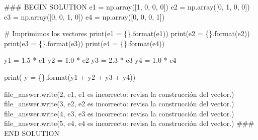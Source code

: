 \documentclass[
  letterpaper,
  DIV=11,
  numbers=noendperiod]{scrreprt}
\newenvironment{Shaded}{\begin{snugshade}}{\end{snugshade}}
\newcommand{\BuiltInTok}[1]{\textcolor[rgb]{0.00,0.23,0.31}{#1}}
\newcommand{\CommentTok}[1]{\textcolor[rgb]{0.37,0.37,0.37}{#1}}
\newcommand{\DecValTok}[1]{\textcolor[rgb]{0.68,0.00,0.00}{#1}}
\newcommand{\FloatTok}[1]{\textcolor[rgb]{0.68,0.00,0.00}{#1}}
\newcommand{\NormalTok}[1]{\textcolor[rgb]{0.00,0.23,0.31}{#1}}
\newcommand{\OperatorTok}[1]{\textcolor[rgb]{0.37,0.37,0.37}{#1}}
\newcommand{\RegionMarkerTok}[1]{\textcolor[rgb]{0.00,0.23,0.31}{#1}}
\newcommand{\SpecialCharTok}[1]{\textcolor[rgb]{0.37,0.37,0.37}{#1}}
\newcommand{\StringTok}[1]{\textcolor[rgb]{0.13,0.47,0.30}{#1}}
\begin{document}
\begin{Shaded}
\begin{Highlighting}[]
\CommentTok{\#\#\# }\RegionMarkerTok{BEGIN}\CommentTok{ SOLUTION}
\NormalTok{e1 }\OperatorTok{=}\NormalTok{ np.array([}\DecValTok{1}\NormalTok{, }\DecValTok{0}\NormalTok{, }\DecValTok{0}\NormalTok{, }\DecValTok{0}\NormalTok{])}
\NormalTok{e2 }\OperatorTok{=}\NormalTok{ np.array([}\DecValTok{0}\NormalTok{, }\DecValTok{1}\NormalTok{, }\DecValTok{0}\NormalTok{, }\DecValTok{0}\NormalTok{])}
\NormalTok{e3 }\OperatorTok{=}\NormalTok{ np.array([}\DecValTok{0}\NormalTok{, }\DecValTok{0}\NormalTok{, }\DecValTok{1}\NormalTok{, }\DecValTok{0}\NormalTok{])}
\NormalTok{e4 }\OperatorTok{=}\NormalTok{ np.array([}\DecValTok{0}\NormalTok{, }\DecValTok{0}\NormalTok{, }\DecValTok{0}\NormalTok{, }\DecValTok{1}\NormalTok{])}

\CommentTok{\# Imprimimos los vectores}
\BuiltInTok{print}\NormalTok{(}\StringTok{\textquotesingle{}e1 = }\SpecialCharTok{\{\}}\StringTok{\textquotesingle{}}\NormalTok{.}\BuiltInTok{format}\NormalTok{(e1))}
\BuiltInTok{print}\NormalTok{(}\StringTok{\textquotesingle{}e2 = }\SpecialCharTok{\{\}}\StringTok{\textquotesingle{}}\NormalTok{.}\BuiltInTok{format}\NormalTok{(e2))}
\BuiltInTok{print}\NormalTok{(}\StringTok{\textquotesingle{}e3 = }\SpecialCharTok{\{\}}\StringTok{\textquotesingle{}}\NormalTok{.}\BuiltInTok{format}\NormalTok{(e3))}
\BuiltInTok{print}\NormalTok{(}\StringTok{\textquotesingle{}e4 = }\SpecialCharTok{\{\}}\StringTok{\textquotesingle{}}\NormalTok{.}\BuiltInTok{format}\NormalTok{(e4))}

\NormalTok{y1 }\OperatorTok{=} \FloatTok{1.5} \OperatorTok{*}\NormalTok{ e1}
\NormalTok{y2 }\OperatorTok{=} \FloatTok{1.0} \OperatorTok{*}\NormalTok{ e2}
\NormalTok{y3 }\OperatorTok{=} \FloatTok{2.3} \OperatorTok{*}\NormalTok{ e3}
\NormalTok{y4 }\OperatorTok{={-}}\FloatTok{1.0} \OperatorTok{*}\NormalTok{ e4}

\BuiltInTok{print}\NormalTok{(}\StringTok{\textquotesingle{} y = }\SpecialCharTok{\{\}}\StringTok{\textquotesingle{}}\NormalTok{.}\BuiltInTok{format}\NormalTok{(y1 }\OperatorTok{+}\NormalTok{ y2 }\OperatorTok{+}\NormalTok{ y3 }\OperatorTok{+}\NormalTok{ y4))}

\NormalTok{file\_answer.write(}\StringTok{\textquotesingle{}2\textquotesingle{}}\NormalTok{, e1, }\StringTok{\textquotesingle{}e1 es incorrecto: revisa la construcción del vector.\textquotesingle{}}\NormalTok{)}
\NormalTok{file\_answer.write(}\StringTok{\textquotesingle{}3\textquotesingle{}}\NormalTok{, e2, }\StringTok{\textquotesingle{}e2 es incorrecto: revisa la construcción del vector.\textquotesingle{}}\NormalTok{)}
\NormalTok{file\_answer.write(}\StringTok{\textquotesingle{}4\textquotesingle{}}\NormalTok{, e3, }\StringTok{\textquotesingle{}e3 es incorrecto: revisa la construcción del vector.\textquotesingle{}}\NormalTok{)}
\NormalTok{file\_answer.write(}\StringTok{\textquotesingle{}5\textquotesingle{}}\NormalTok{, e4, }\StringTok{\textquotesingle{}e4 es incorrecto: revisa la construcción del vector.\textquotesingle{}}\NormalTok{)}
\CommentTok{\#\#\# }\RegionMarkerTok{END}\CommentTok{ SOLUTION}
\end{Highlighting}
\end{Shaded}
\end{document}

